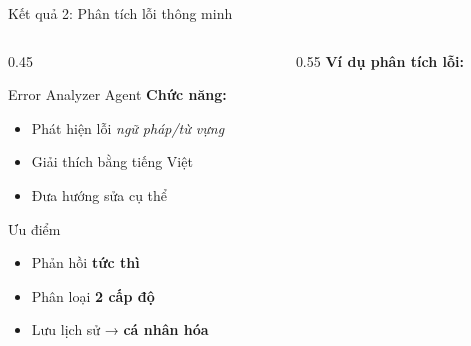 \documentclass[notheorems,hyperref={bookmarks=true}]{beamer}
\begin{document}
\begin{frame}{Kết quả 2: Phân tích lỗi thông minh}
\begin{columns}
    \begin{column}{0.45\textwidth}
        \begin{exampleblock}{Error Analyzer Agent}
            \textbf{Chức năng:}
            \begin{itemize}
                \item Phát hiện lỗi \textit{ngữ pháp/từ vựng}
                \item Giải thích bằng tiếng Việt
                \item Đưa hướng sửa cụ thể
            \end{itemize}
        \end{exampleblock}
        
        \vspace{0.3cm}
        
        \begin{alertblock}{Ưu điểm}
            \begin{itemize}
                \item Phản hồi \textbf{tức thì}
                \item Phân loại \textbf{2 cấp độ}
                \item Lưu lịch sử → \textbf{cá nhân hóa}
            \end{itemize}
        \end{alertblock}
    \end{column}
    \begin{column}{0.55\textwidth}
        \centering
        \textbf{Ví dụ phân tích lỗi:}\\[0.3cm]
        
    \end{column}
\end{columns}
\end{frame}
\end{document}
